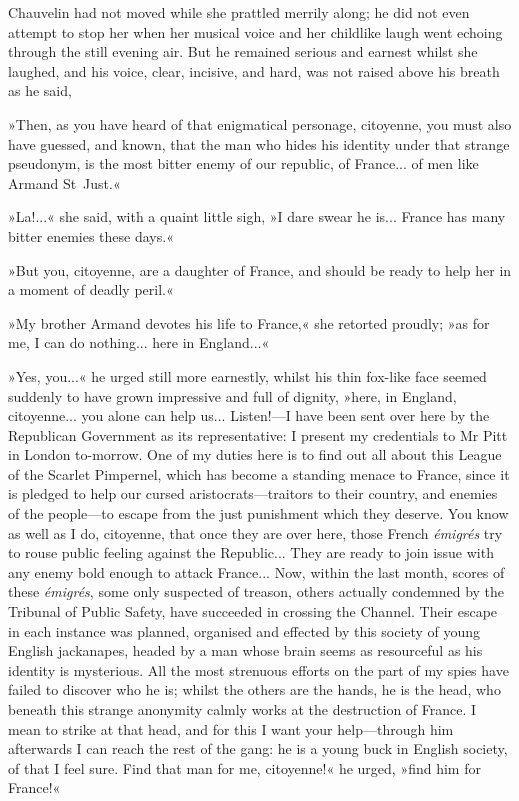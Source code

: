 Chauvelin had not moved while she prattled merrily along; he did not even attempt to stop her when her musical voice and her childlike laugh went echoing through the still evening air. But he remained serious and earnest whilst she laughed, and his voice, clear, incisive, and hard, was not raised above his breath as he said,\longdash


»Then, as you have heard of that enigmatical personage, citoyenne, you must also have guessed, and known, that the man who hides his identity under that strange pseudonym, is the most bitter enemy of our republic, of France... of men like Armand St~Just.«

»La!...« she said, with a quaint little sigh, »I dare swear he is... France has many bitter enemies these days.«

»But you, citoyenne, are a daughter of France, and should be ready to help her in a moment of deadly peril.«

»My brother Armand devotes his life to France,« she retorted proudly; »as for me, I can do nothing... here in England...«

»Yes, you...« he urged still more earnestly, whilst his thin fox-like face seemed suddenly to have grown impressive and full of dignity, »here, in England, citoyenne... you alone can help us... Listen!\allowbreak---\allowbreak I have been sent over here by the Republican Government as its representative: I present my credentials to Mr Pitt in London to-morrow. One of my duties here is to find out all about this League of the Scarlet Pimpernel, which has become a standing menace to France, since it is pledged to help our cursed aristocrats\allowbreak---\allowbreak traitors to their country, and enemies of the people\allowbreak---\allowbreak to escape from the just punishment which they deserve. You know as well as I do, citoyenne, that once they are over here, those French \textit{émigrés} try to rouse public feeling against the Republic... They are ready to join issue with any enemy bold enough to attack France... Now, within the last month, scores of these \textit{émigrés}, some only suspected of treason, others actually condemned by the Tribunal of Public Safety, have succeeded in crossing the Channel. Their escape in each instance was planned, organised and effected by this society of young English jackanapes, headed by a man whose brain seems as resourceful as his identity is mysterious. All the most strenuous efforts on the part of my spies have failed to discover who he is; whilst the others are the hands, he is the head, who beneath this strange anonymity calmly works at the destruction of France. I mean to strike at that head, and for this I want your help\allowbreak---\allowbreak through him afterwards I can reach the rest of the gang: he is a young buck in English society, of that I feel sure. Find that man for me, citoyenne!« he urged, »find him for France!«

